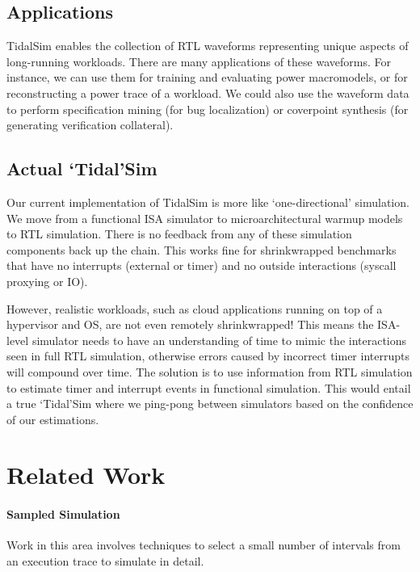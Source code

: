 \documentclass[sigplan,nonacm,10pt]{acmart}
\begin{document}
\subsection{Applications}

TidalSim enables the collection of RTL waveforms representing unique aspects of long-running workloads.
There are many applications of these waveforms.
For instance, we can use them for training and evaluating power macromodels, or for reconstructing a power trace of a workload.
We could also use the waveform data to perform specification mining (for bug localization) or coverpoint synthesis (for generating verification collateral).

\subsection{Actual `Tidal'Sim}

Our current implementation of TidalSim is more like `one-directional' simulation.
We move from a functional ISA simulator to microarchitectural warmup models to RTL simulation.
There is no feedback from any of these simulation components back up the chain.
This works fine for shrinkwrapped benchmarks that have no interrupts (external or timer) and no outside interactions (syscall proxying or IO).

However, realistic workloads, such as cloud applications running on top of a hypervisor and OS, are not even remotely shrinkwrapped!
This means the ISA-level simulator needs to have an understanding of time to mimic the interactions seen in full RTL simulation, otherwise errors caused by incorrect timer interrupts will compound over time.
The solution is to use information from RTL simulation to estimate timer and interrupt events in functional simulation.
This would entail a true `Tidal'Sim where we ping-pong between simulators based on the confidence of our estimations.

\section{Related Work}

\paragraph{Sampled Simulation} Work in this area involves techniques to select a small number of intervals from an execution trace to simulate in detail.
\end{document}
